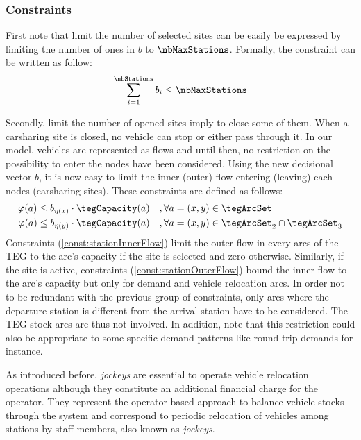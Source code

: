 \begin{bibunit}[ieeetr]
\subsubsection{Constraints}
First note that limit the number of selected sites can be easily be expressed by limiting the number of ones in $b$ to $\nbMaxStations$.
Formally, the constraint can be written as follow:
\begin{equation} \label{const:nbMaxStations}
\sum_{i=1}^\nbStations b_i \leq \nbMaxStations
\end{equation}

\medskip
Secondly, limit the number of opened sites imply to close some of them.
When a carsharing site is closed, no vehicle can stop or either pass through it.
In our model, vehicles are represented as flows and until then, no restriction on the possibility to enter the nodes have been considered.
Using the new decisional vector $b$, it is now easy to limit the inner (\resp outer) flow entering (\resp leaving) each nodes (carsharing sites).
These constraints are defined as follows:
\begin{align}
\varphi(a) \leq b_{\eta(x)} \cdot \tegCapacity(a) \quad & , \forall a = (x, y) \in \tegArcSet \label{const:stationInnerFlow} \\
\varphi(a) \leq b_{\eta(y)} \cdot \tegCapacity(a) \quad & , \forall a = (x, y) \in \tegArcSet_2 \cap \tegArcSet_3 \label{const:stationOuterFlow}
\end{align}
Constraints (\ref{const:stationInnerFlow}) limit the outer flow in every arcs of the TEG to the arc's capacity if the site is selected and zero otherwise.
Similarly, if the site is active, constraints (\ref{const:stationOuterFlow}) bound the inner flow to the arc's capacity but only for demand and vehicle relocation arcs.
In order not to be redundant with the previous group of constraints, only arcs where the departure station is different from the arrival station have to be considered.
The TEG stock arcs are thus not involved.
In addition, note that this restriction could also be appropriate to some specific demand patterns like round-trip demands for instance.

\medskip
As introduced before, \emph{jockeys} are essential to operate vehicle relocation operations although they constitute an additional financial charge for the operator.
They represent the operator-based approach to balance vehicle stocks through the system and correspond to periodic relocation of vehicles among stations by staff members, also known as \emph{jockeys}.


\end{bibunit}
